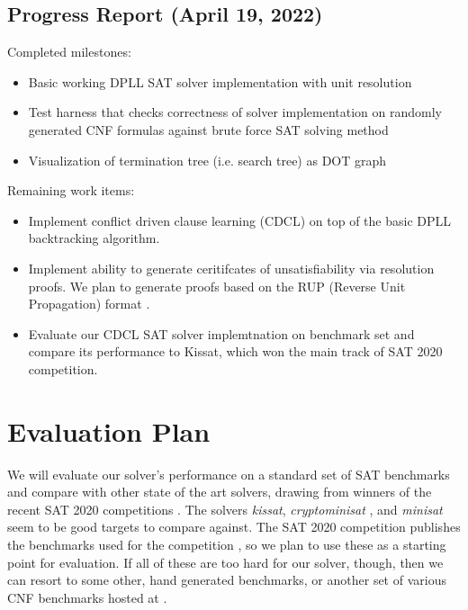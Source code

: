 \documentclass[12pt]{article}
\begin{document}
\subsection*{Progress Report (April 19, 2022)}

Completed milestones:

\begin{itemize}
    \item Basic working DPLL SAT solver implementation with unit resolution
    \item Test harness that checks correctness of solver implementation on randomly generated CNF formulas against brute force SAT solving method
    \item Visualization of termination tree (i.e. search tree) as DOT graph
\end{itemize}
Remaining work items:
\begin{itemize}
    \item Implement conflict driven clause learning (CDCL) on top of the basic DPLL backtracking algorithm.
    \item Implement ability to generate ceritifcates of unsatisfiability via resolution proofs. We plan to generate proofs based on the RUP (Reverse Unit Propagation) format \cite{goldberg03,heule13}.
    \item Evaluate our CDCL SAT solver implemtnation on benchmark set and compare its performance to Kissat, which won the main track of SAT 2020 competition.
\end{itemize}


\section{Evaluation Plan}
We will evaluate our solver's performance on a standard set of SAT benchmarks and compare with other state of the art solvers, drawing from winners of the recent SAT 2020 competitions \cite{2020satresults}. The solvers \textit{kissat}\cite{2020kissat}, \textit{cryptominisat} \cite{09cryptominisat}, and \textit{minisat}\cite{minisat} seem to be good targets to compare against. The SAT 2020 competition publishes the benchmarks used for the competition \cite{sat2020benchmarks}, so we plan to use these as a starting point for evaluation. If all of these are too hard for our solver, though, then we can resort to some other, hand generated benchmarks, or another set of various CNF benchmarks hosted at \cite{dimacsCNF}.



\end{document}
